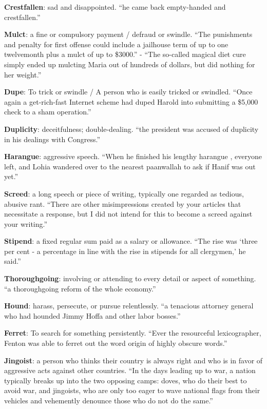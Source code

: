 \documentclass[12pt, a4paper]{ximera}
\begin{document}
\textbf{Crestfallen}: sad and disappointed. ``he came back empty-handed and crestfallen.''

\textbf{Mulct}: a fine or compulsory payment / defraud or swindle. ``The punishments and penalty for first offense could include a jailhouse term of up to one twelvemonth plus a mulct of up to \$3000.'' - ``The so-called magical diet cure simply ended up mulcting Maria out of hundreds of dollars, but did nothing for her weight.''

\textbf{Dupe}: To trick or swindle / A person who is easily tricked or swindled. ``Once again a get-rich-fast Internet scheme had duped Harold into submitting a \$5,000 check to a sham operation.''

\textbf{Duplicity}: deceitfulness; double-dealing. ``the president was accused of duplicity in his dealings with Congress.''

\textbf{Harangue}: aggressive speech. ``When he finished his lengthy harangue , everyone left, and Lohia wandered over to the nearest paanwallah to ask if Hanif was out yet.''

\textbf{Screed}: a long speech or piece of writing, typically one regarded as tedious, abusive rant. ``There are other misimpressions created by your articles that necessitate a response, but I did not intend for this to become a screed against your writing.''

\textbf{Stipend}: a fixed regular sum paid as a salary or allowance. ``The rise was ‘three per cent - a percentage in line with the rise in stipends for all clergymen,’ he said.''

\textbf{Thoroughgoing}: involving or attending to every detail or aspect of something. ``a thoroughgoing reform of the whole economy.''

\textbf{Hound}: harass, persecute, or pursue relentlessly. ``a tenacious attorney general who had hounded Jimmy Hoffa and other labor bosses.''

\textbf{Ferret}: To search for something persistently. ``Ever the resourceful lexicographer, Fenton was able to ferret out the word origin of highly obscure words.''

\textbf{Jingoist}: a person who thinks their country is always right and who is in favor of aggressive acts against other countries. ``In the days leading up to war, a nation typically breaks up into the two opposing camps: doves, who do their best to avoid war, and jingoists, who are only too eager to wave national flags from their vehicles and vehemently denounce those who do not do the same.''
\end{document}

